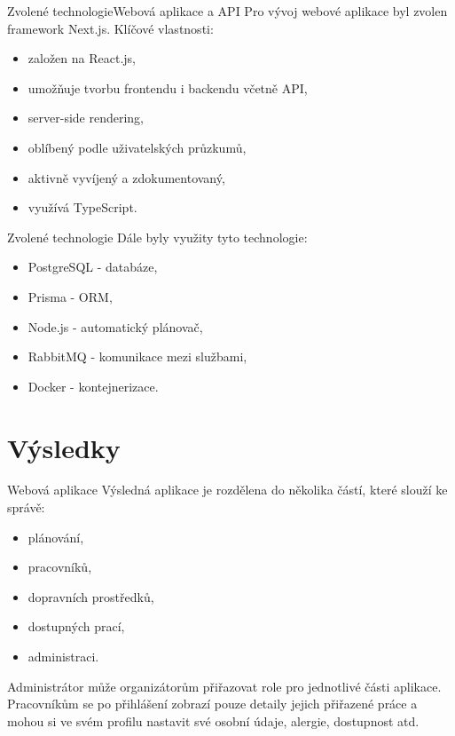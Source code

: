 \documentclass[czech,aspectratio=169]{beamer}
\begin{document}
  \begin{frame}{Zvolené technologie}{Webová aplikace a API}
    Pro vývoj webové aplikace byl zvolen framework Next.js.
    Klíčové vlastnosti:
    \begin{itemize}
      \item založen na React.js,
      \item umožňuje tvorbu frontendu i backendu včetně API,
      \item server-side rendering,
      \item oblíbený podle uživatelských průzkumů,
      \item aktivně vyvíjený a zdokumentovaný,
      \item využívá TypeScript.
    \end{itemize}
  \end{frame}

  \begin{frame}{Zvolené technologie}
    Dále byly využity tyto technologie:
    \begin{itemize}
      \item PostgreSQL - databáze,
      \item Prisma - ORM,
      \item Node.js - automatický plánovač,
      \item RabbitMQ - komunikace mezi službami,
      \item Docker - kontejnerizace.
    \end{itemize}
  \end{frame}

  \section{Výsledky}
  \begin{frame}{Webová aplikace}
    Výsledná aplikace je rozdělena do několika částí, které slouží ke správě:
    \begin{itemize}
      \item plánování,
      \item pracovníků,
      \item dopravních prostředků,
      \item dostupných prací,
      \item administraci.
    \end{itemize}
    
    Administrátor může organizátorům přiřazovat role pro jednotlivé části aplikace. Pracovníkům se po přihlášení zobrazí pouze detaily jejich přiřazené práce
    a mohou si ve svém profilu nastavit své osobní údaje, alergie, dostupnost atd.
  \end{frame}
\end{document}
